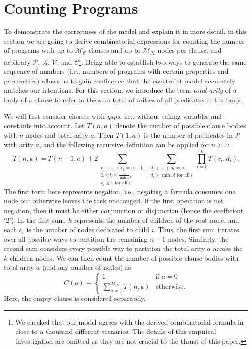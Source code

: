 \documentclass[runningheads]{llncs}
\newcommand{\predicates}{\mathcal{P}}
\newcommand{\variables}{\mathcal{V}}
\newcommand{\constants}{\mathcal{C}}
\newcommand{\arities}{\mathcal{A}}
\newcommand{\maxNumNodes}{\mathcal{M}_{\mathcal{N}}}
\newcommand{\maxNumClauses}{\mathcal{M}_{\mathcal{C}}}
\begin{document}
\section{Counting Programs} \label{sec:counting}

To demonstrate the correctness of the model and explain it in more
detail, in this section we are going to derive combinatorial expressions for
counting the number of programs with up to $\maxNumClauses{}$ clauses and up to
$\maxNumNodes{}$ nodes per clause, and arbitrary $\predicates{}$,
$\arities{}$, $\variables{}$, and $\constants{}$\footnote{We checked that
  our model agrees with the derived combinatorial formula in close to a thousand
  different scenarios. The details of this empirical investigation are omitted
  as they are not crucial to the thrust of this paper.}. Being able to establish
two ways to generate the same sequence of numbers (i.e., numbers of programs
with certain properties and parameters) allows us to gain confidence that the
constraint model accurately matches our intentions. For this section, we
introduce the term \emph{total arity} of a body of a clause to refer to the sum
total of arities of all predicates in the body.

We will first consider clauses with \emph{gaps}, i.e., without taking variables
and constants into account. Let $T(n, a)$ denote the number of possible clause
bodies with $n$ nodes and total arity $a$. Then $T(1, a)$ is the number of
predicates in $\predicates{}$ with arity $a$, and the following recursive
definition can be applied for $n > 1$:
\[
  T(n, a) = T(n-1, a) + 2\sum_{\substack{c_1 + \dots + c_k = n - 1,\\ 2 \le k
      \le \frac{a}{\min \arities{}},\\ c_i \ge 1 \text{ for all } i}}
  \sum_{\substack{d_1 + \dots + d_k = a,\\ d_i \ge \min \arities{} \text{ for
        all } i}} \prod_{i=1}^k T(c_i, d_i).
\]
The first term here represents negation, i.e., negating a formula consumes
one node but otherwise leaves the task unchanged. If the first operation is not
negation, then it must be either conjunction or disjunction (hence the
coefficient `2'). In the first sum, $k$ represents the number of children of the
root node, and each $c_i$ is the number of nodes dedicated to child $i$. Thus,
the first sum iterates over all possible ways to partition the remaining $n-1$
nodes. Similarly, the second sum considers every possible way to partition the
total arity $a$ across the $k$ children nodes. We can then count the number of
possible clause bodies with total arity $a$ (and any number of nodes) as
\[
  C(a) = \begin{cases}
    1 & \text{if } a = 0\\
    \sum_{n=1}^{\maxNumNodes{}} T(n, a) & \text{otherwise.}
  \end{cases}
\]
Here, the empty clause is considered separately.
\end{document}
